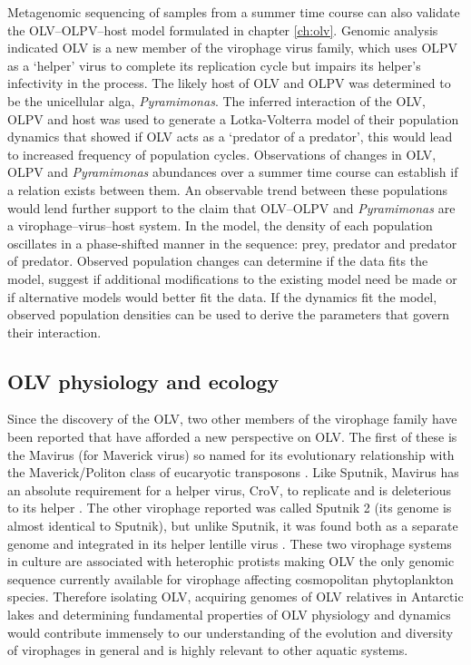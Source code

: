 Metagenomic sequencing of samples from a summer time course can also validate the \ac{OLV}--\ac{OLPV}--host model formulated in chapter \ref{ch:olv}.
Genomic analysis indicated \ac{OLV} is a new member of the virophage virus family, which uses \ac{OLPV} as a `helper' virus to complete its replication cycle but impairs its helper's infectivity in the process.
The likely host of \ac{OLV} and \ac{OLPV} was determined to be the unicellular alga, \emph{Pyramimonas}.
The inferred interaction of the \ac{OLV}, \ac{OLPV} and host was used to generate a Lotka-Volterra model of their population dynamics that showed if \ac{OLV} acts as a `predator of a predator', this would lead to increased frequency of population cycles.
Observations of changes in \ac{OLV}, \ac{OLPV} and \emph{Pyramimonas} abundances over a summer time course can establish if a relation exists between them.
An observable trend between these populations would lend further support to the claim that \ac{OLV}--\ac{OLPV} and \emph{Pyramimonas} are a virophage--virus--host system.
In the model, the density of each population oscillates in a phase-shifted manner in the sequence: prey, predator and predator of predator.
Observed population changes can determine if the data fits the model, suggest if additional modifications to the existing model need be made or if alternative models would better fit the data.
If the dynamics fit the model, observed population densities can be used to derive the parameters that govern their interaction.

\subsection{\acs{OLV} physiology and ecology}
Since the discovery of the \ac{OLV}, two other members of the virophage family have been reported that have afforded a new perspective on \ac{OLV}.
The first of these is the Mavirus (for Maverick virus) so named for its evolutionary relationship with the Maverick/Politon class of eucaryotic transposons \cite{Fischer2011a}.
Like Sputnik, Mavirus has an absolute requirement for a helper virus, \ac{CroV}, to replicate and is deleterious to its helper \cite{Fischer2011a}.
The other virophage reported was called Sputnik 2 (its genome is almost identical to Sputnik), but unlike Sputnik, it was found both as a separate genome and integrated in its helper lentille virus \cite{Desnues2012}.
These two virophage systems in culture are associated with heterophic protists making \ac{OLV} the only genomic sequence currently available for virophage affecting cosmopolitan phytoplankton species.
Therefore isolating \ac{OLV}, acquiring genomes of \ac{OLV} relatives in Antarctic lakes and determining fundamental properties of \ac{OLV} physiology and dynamics would contribute immensely to our understanding of the evolution and diversity of virophages in general and is highly relevant to other aquatic systems.

